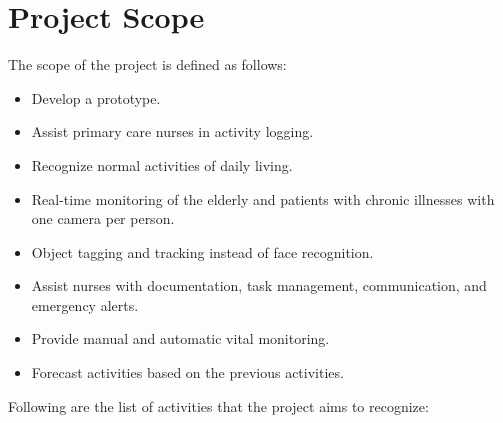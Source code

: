 \section{Project Scope}
The scope of the project is defined as follows:
\begin{itemize}
    \item Develop a prototype.
    \item Assist primary care nurses in activity logging.
    \item Recognize normal activities of daily living.
    \item Real-time monitoring of the elderly and patients with chronic illnesses with one camera per person.
    \item Object tagging and tracking instead of face recognition.
    \item Assist nurses with documentation, task management, communication, and emergency alerts.
    \item Provide manual and automatic vital monitoring.
    \item Forecast activities based on the previous activities.
\end{itemize}
Following are the list of activities that the project aims to recognize: \\

